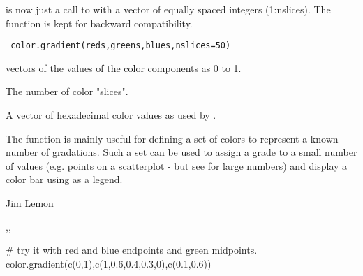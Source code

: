 \begin{Description}\relax
{} is now just a call to  with a
vector of equally spaced integers (1:nslices). The function is kept for
backward compatibility.
\end{Description}
\begin{Usage}
\begin{verbatim}
 color.gradient(reds,greens,blues,nslices=50)
\end{verbatim}
\end{Usage}
\begin{Arguments}
\begin{ldescription}
\item[\code{reds,greens,blues}] vectors of the values of the color components
as 0 to 1.
\item[\code{nslices}] The number of color "slices".
\end{ldescription}
\end{Arguments}
\begin{Value}
A vector of hexadecimal color values as used by .
\end{Value}
\begin{Note}\relax
The function is mainly useful for defining a set of colors to represent
a known number of gradations. Such a set can be used to assign a grade
to a small number of values (e.g. points on a scatterplot - but see 
 for large numbers) and display a color bar using
 as a legend.
\end{Note}
\begin{Author}\relax
Jim Lemon
\end{Author}
\begin{SeeAlso}\relax
{},,
\end{SeeAlso}
\begin{Examples}
\begin{ExampleCode}
 # try it with red and blue endpoints and green midpoints.
 color.gradient(c(0,1),c(1,0.6,0.4,0.3,0),c(0.1,0.6))
\end{ExampleCode}
\end{Examples}

